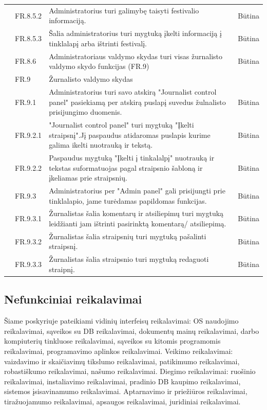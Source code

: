 \documentclass{VUMIFPSkursinis}
\begin{document}
\begin{longtable}{|p{1cm}|p{3cm}|p{9cm}|c|}
 & FR.8.5.2 & Administratorius turi galimybę taisyti festivalio informaciją. & Būtina \\ \cline{2-4} 
 & FR.8.5.3 & Šalia administratorius turi mygtuką įkelti informaciją į tinklalapį arba ištrinti festivalį. & Būtina \\ \cline{2-4} 
 & FR.8.6 & Administratoriaus valdymo skydas turi visas žurnalisto valdymo skydo funkcijas (FR.9) & Būtina \\ \cline{2-4} 
 & \cellcolor{light-gray} FR.9 & \multicolumn{2}{l|}{ \cellcolor{light-gray}Žurnalisto valdymo skydas} \\ \cline{2-4} 
 & FR.9.1 & Administratorius turi savo atskirą "Journalist control panel" pasiekiamą per atskirą puslapį suvedus žulnalisto prisijungimo duomenis. & Būtina \\ \cline{2-4} 
 & FR.9.2.1 & "Journalist control panel" turi mygtuką "Įkelti straipsnį".Jį paspaudus atidaromas puslapis kurime galima ikelti nuotrauką ir tekstą. & Būtina \\ \cline{2-4} 
 & FR.9.2.2 & Paspaudus mygtuką "Įkelti į tinkalalpį" nuotrauką ir tekstas suformatuojas pagal straipsnio šabloną ir įkeliamas prie straipsnių. & Būtina \\ \cline{2-4} 
 & FR.9.3 & Administratorius per "Admin panel" gali prisijungti prie tinklalapio, jame turėdamas papildomas funkcijas. & Būtina \\ \cline{2-4} 
 & FR.9.3.1 & Žurnalistas šalia komentarų ir atsiliepimų turi mygtuką leidžianti jam ištrinti pasirinktą komentarą/ atsiliepimą. & Būtina \\ \cline{2-4} 
 & FR.9.3.2 & Žurnalistas šalia straipsnių turi mygtuką pašalinti straipsnį. & Būtina \\ \cline{2-4} 
 & FR.9.3.3 & Žurnalistas šalia straipsnio turi mygtuką redaguoti straipnį. & Būtina \\ \hline
\end{longtable}
\newpage

\subsection{Nefunkciniai reikalavimai}
Šiame poskyriuje pateikiami vidinių interfeisų reikalavimai: OS naudojimo reikalavimai, sąveikos su DB reikalavimai, dokumentų mainų reikalavimai, darbo kompiuterių tinkluose reikalavimai, sąveikos su kitomis programomis reikalavimai, programavimo aplinkos reikalavimai. Veikimo reikalavimai: vaizdavimo ir skaičiavimų tikslumo reikalavimai, patikimumo reikalavimai, robastiškumo reikalavimai, našumo reikalavimai. Diegimo reikalavimai: ruošinio reikalavimai, instaliavimo reikalavimai, pradinio DB kaupimo reikalavimai, sistemos įsisavinamumo reikalavimai. Aptarnavimo ir priežiūros reikalavimai, tiražuojamumo reikalavimai, apsaugos reikalavimai, juridiniai reikalavimai. 
\end{document}
